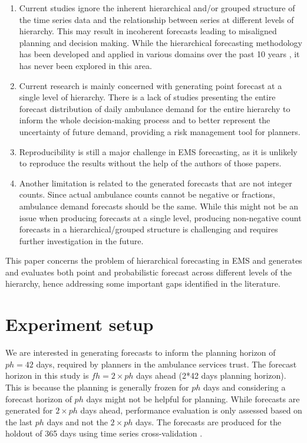 \documentclass[
  authoryear,
  preprint,
  3p]{elsarticle}
\begin{document}
\begin{enumerate}
\def\labelenumi{\arabic{enumi}.}
\item
  Current studies ignore the inherent hierarchical and/or grouped
  structure of the time series data and the relationship between series
  at different levels of hierarchy. This may result in incoherent
  forecasts leading to misaligned planning and decision making. While
  the hierarchical forecasting methodology has been developed and
  applied in various domains over the past 10 years
  \citep{panagiotelis2022probabilistic}, it has never been explored in
  this area.
\item
  Current research is mainly concerned with generating point forecast at
  a single level of hierarchy. There is a lack of studies presenting the
  entire forecast distribution of daily ambulance demand for the entire
  hierarchy to inform the whole decision-making process and to better
  represent the uncertainty of future demand, providing a risk
  management tool for planners.
\item
  Reproducibility is still a major challenge in EMS forecasting, as it
  is unlikely to reproduce the results without the help of the authors
  of those papers.
\item
  Another limitation is related to the generated forecasts that are not
  integer counts. Since actual ambulance counts cannot be negative or
  fractions, ambulance demand forecasts should be the same. While this
  might not be an issue when producing forecasts at a single level,
  producing non-negative count forecasts in a hierarchical/grouped
  structure is challenging and requires further investigation in the
  future.
\end{enumerate}

This paper concerns the problem of hierarchical forecasting in EMS and
generates and evaluates both point and probabilistic forecast across
different levels of the hierarchy, hence addressing some important gaps
identified in the literature.

\hypertarget{sec-experiment}{%
\section{Experiment setup}\label{sec-experiment}}

We are interested in generating forecasts to inform the planning horizon
of \(ph= 42\) days, required by planners in the ambulance services
trust. The forecast horizon in this study is \(fh = 2 \times ph\) days
ahead (2*42 days planning horizon). This is because the planning is
generally frozen for \(ph\) days and considering a forecast horizon of
\(ph\) days might not be helpful for planning. While forecasts are
generated for \(2 \times ph\) days ahead, performance evaluation is only
assessed based on the last \(ph\) days and not the \(2 \times ph\) days.
The forecasts are produced for the holdout of 365 days using time series
cross-validation \citep{hyndman2021forecasting}.
\end{document}
